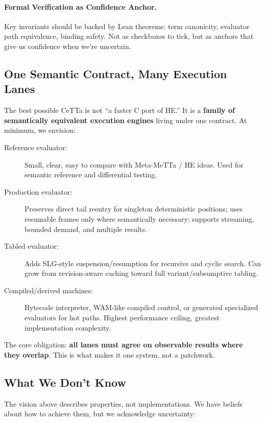 \documentclass[11pt]{article}
\newcommand{\HE}{\textup{HE}}
\newcommand{\CeTTa}{\textup{CeTTa}}
\begin{document}
\paragraph{Formal Verification as Confidence Anchor.}
Key invariants should be backed by Lean theorems: term canonicity,
evaluator path equivalence, binding safety.  Not as checkboxes to tick,
but as anchors that give us confidence when we're uncertain.

\subsection{One Semantic Contract, Many Execution Lanes}

The best possible \CeTTa{} is not ``a faster C port of \HE{}.''  It is
a \textbf{family of semantically equivalent execution engines} living
under one contract.  At minimum, we envision:

\begin{description}
\item[Reference evaluator:] Small, clear, easy to compare with Meta-MeTTa /
  \HE{} ideas.  Used for semantic reference and differential testing.
\item[Production evaluator:] Preserves direct tail reentry for singleton
  deterministic positions; uses resumable frames only where semantically
  necessary; supports streaming, bounded demand, and multiple results.
\item[Tabled evaluator:] Adds SLG-style suspension/resumption for recursive
  and cyclic search.  Can grow from revision-aware caching toward full
  variant/subsumptive tabling.
\item[Compiled/derived machines:] Bytecode interpreter, WAM-like compiled
  control, or generated specialized evaluators for hot paths.  Highest
  performance ceiling, greatest implementation complexity.
\end{description}

The core obligation: \textbf{all lanes must agree on observable results
where they overlap}.  This is what makes it one system, not a patchwork.

\subsection{What We Don't Know}

The vision above describes properties, not implementations.  We have
beliefs about how to achieve them, but we acknowledge uncertainty:
\end{document}
